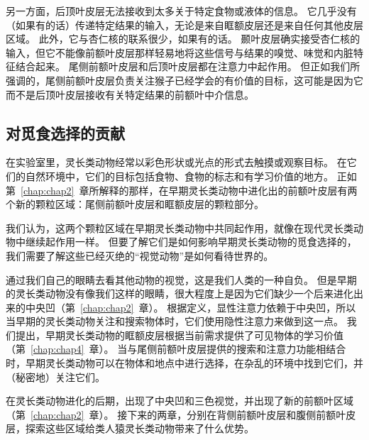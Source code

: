 另一方面，后顶叶皮层无法接收到太多关于特定食物或液体的信息。
它几乎没有（如果有的话）传递特定结果的输入，无论是来自眶额皮层还是来自任何其他皮层区域。
此外，它与杏仁核的联系很少，如果有的话。
颞叶皮层确实接受杏仁核的输入，但它不能像前额叶皮层那样轻易地将这些信号与结果的嗅觉、味觉和内脏特征结合起来。
尾侧前额叶皮层和后顶叶皮层都在注意力中起作用。
但正如我们所强调的，尾侧前额叶皮层负责关注猴子已经学会的有价值的目标，这可能是因为它而不是后顶叶皮层接收有关特定结果的前额叶中介信息。



\subsection{对觅食选择的贡献}

在实验室里，灵长类动物经常以彩色形状或光点的形式去触摸或观察目标。
在它们的自然环境中，它们的目标包括食物、食物的标志和有学习价值的地方。
正如第~\ref{chap:chap2}~章所解释的那样，在早期灵长类动物中进化出的前额叶皮层有两个新的颗粒区域：尾侧前额叶皮层和眶额皮层的颗粒部分。


我们认为，这两个颗粒区域在早期灵长类动物中共同起作用，就像在现代灵长类动物中继续起作用一样。
但要了解它们是如何影响早期灵长类动物的觅食选择的，我们需要了解这些已经灭绝的“视觉动物”是如何看待世界的。


通过我们自己的眼睛去看其他动物的视觉，这是我们人类的一种自负。
但是早期的灵长类动物没有像我们这样的眼睛，很大程度上是因为它们缺少一个后来进化出来的中央凹（第~\ref{chap:chap2}~章）。
根据定义，显性注意力依赖于中央凹，所以当早期的灵长类动物关注和搜索物体时，它们使用隐性注意力来做到这一点。
我们提出，早期灵长类动物的眶额皮层根据当前需求提供了可见物体的学习价值（第~\ref{chap:chap4}~章）。
当与尾侧前额叶皮层提供的搜索和注意力功能相结合时，早期灵长类动物可以在物体和地点中进行选择，在杂乱的环境中找到它们，并（秘密地）关注它们。


在灵长类动物进化的后期，出现了中央凹和三色视觉，并出现了新的前额叶区域（第~\ref{chap:chap2}~章）。
接下来的两章，分别在背侧前额叶皮层和腹侧前额叶皮层，探索这些区域给类人猿灵长类动物带来了什么优势。


